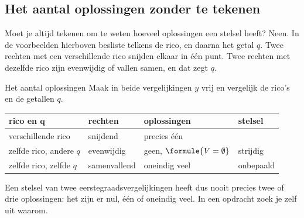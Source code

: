 \subsection{Het aantal oplossingen zonder te tekenen}

Moet je altijd tekenen om te weten hoeveel oplossingen een stelsel heeft? Neen. In de voorbeelden hierboven besliste telkens de rico, en daarna het getal $q$. Twee rechten met een verschillende rico snijden elkaar in één punt. Twee rechten met dezelfde rico zijn evenwijdig of vallen samen, en dat zegt $q$.

\begin{theorie}
\begin{stelling}{Het aantal oplossingen}
Maak in beide vergelijkingen $y$ vrij en vergelijk de rico's en de getallen $q$.

\vspace{1mm}
{\centering{}\renewcommand{\arraystretch}{1.5}%
\begin{tabular}{|>{\centering\arraybackslash}m{3.9cm}|>{\centering\arraybackslash}m{2.6cm}|>{\centering\arraybackslash}m{2.8cm}|>{\centering\arraybackslash}m{2.3cm}|}
\hline
\textbf{rico en $\boldsymbol{q}$} & \textbf{rechten} & \textbf{oplossingen} & \textbf{stelsel} \\ \hline
verschillende rico & snijdend & precies één & \\ \hline
zelfde rico, andere $q$ & evenwijdig & geen, $\formule{V = \emptyset}$ & strijdig \\ \hline
zelfde rico, zelfde $q$ & samenvallend & oneindig veel & onbepaald \\ \hline
\end{tabular}\par}
\end{stelling}
\end{theorie}

Een stelsel van twee eerstegraadsvergelijkingen heeft dus nooit precies twee of drie oplossingen: het zijn er nul, één of oneindig veel. In een opdracht zoek je zelf uit waarom.


